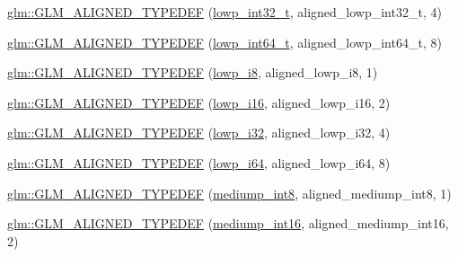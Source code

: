 \begin{DoxyCompactItemize}
\item 
\hyperlink{group__gtx__type__aligned_ga8130ea381d76a2cc34a93ccbb6cf487d}{glm\+::\+G\+L\+M\+\_\+\+A\+L\+I\+G\+N\+E\+D\+\_\+\+T\+Y\+P\+E\+D\+EF} (\hyperlink{group__gtc__type__precision_gad9567c806dc39f534174eef42663119d}{lowp\+\_\+int32\+\_\+t}, aligned\+\_\+lowp\+\_\+int32\+\_\+t, 4)
\item 
\hyperlink{group__gtx__type__aligned_ga7ccb60f3215d293fd62b33b31ed0e7be}{glm\+::\+G\+L\+M\+\_\+\+A\+L\+I\+G\+N\+E\+D\+\_\+\+T\+Y\+P\+E\+D\+EF} (\hyperlink{group__gtc__type__precision_ga14d72e76d57c7f28eca8e933816c9fd6}{lowp\+\_\+int64\+\_\+t}, aligned\+\_\+lowp\+\_\+int64\+\_\+t, 8)
\item 
\hyperlink{group__gtx__type__aligned_gac20d508d2ef5cc95ad3daf083c57ec2a}{glm\+::\+G\+L\+M\+\_\+\+A\+L\+I\+G\+N\+E\+D\+\_\+\+T\+Y\+P\+E\+D\+EF} (\hyperlink{group__gtc__type__precision_gaa2e13ee29c90f75658beed6082541097}{lowp\+\_\+i8}, aligned\+\_\+lowp\+\_\+i8, 1)
\item 
\hyperlink{group__gtx__type__aligned_ga50257b48069a31d0c8d9c1f644d267de}{glm\+::\+G\+L\+M\+\_\+\+A\+L\+I\+G\+N\+E\+D\+\_\+\+T\+Y\+P\+E\+D\+EF} (\hyperlink{group__gtc__type__precision_gaf7bbfd31bcec25a416ea94d09efb5451}{lowp\+\_\+i16}, aligned\+\_\+lowp\+\_\+i16, 2)
\item 
\hyperlink{group__gtx__type__aligned_gaa07e98e67b7a3435c0746018c7a2a839}{glm\+::\+G\+L\+M\+\_\+\+A\+L\+I\+G\+N\+E\+D\+\_\+\+T\+Y\+P\+E\+D\+EF} (\hyperlink{group__gtc__type__precision_ga70fd34e8b8cffc92739161284ed77328}{lowp\+\_\+i32}, aligned\+\_\+lowp\+\_\+i32, 4)
\item 
\hyperlink{group__gtx__type__aligned_ga62601fc6f8ca298b77285bedf03faffd}{glm\+::\+G\+L\+M\+\_\+\+A\+L\+I\+G\+N\+E\+D\+\_\+\+T\+Y\+P\+E\+D\+EF} (\hyperlink{group__gtc__type__precision_ga1f4ded25f71c0f3b4518936d50b54b6e}{lowp\+\_\+i64}, aligned\+\_\+lowp\+\_\+i64, 8)
\item 
\hyperlink{group__gtx__type__aligned_gac8cff825951aeb54dd846037113c72db}{glm\+::\+G\+L\+M\+\_\+\+A\+L\+I\+G\+N\+E\+D\+\_\+\+T\+Y\+P\+E\+D\+EF} (\hyperlink{group__gtc__type__precision_ga3ee8faab2278c44c5785af04b7b18a14}{mediump\+\_\+int8}, aligned\+\_\+mediump\+\_\+int8, 1)
\item 
\hyperlink{group__gtx__type__aligned_ga78f443d88f438575a62b5df497cdf66b}{glm\+::\+G\+L\+M\+\_\+\+A\+L\+I\+G\+N\+E\+D\+\_\+\+T\+Y\+P\+E\+D\+EF} (\hyperlink{group__gtc__type__precision_ga4611997edb6c61606daa11990cf08798}{mediump\+\_\+int16}, aligned\+\_\+mediump\+\_\+int16, 2)
\item 

\end{DoxyCompactItemize}
